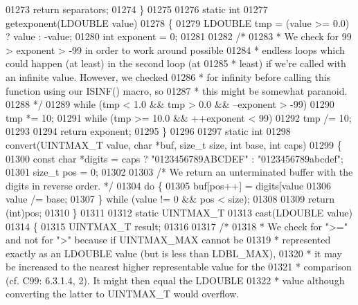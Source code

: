 \begin{DoxyCode}
{{{{{{{{{{01273     \textcolor{keywordflow}{return} separators;
01274 \}
01275 
01276 \textcolor{keyword}{static} \textcolor{keywordtype}{int}
01277 getexponent(LDOUBLE value)
01278 \{
01279     LDOUBLE tmp = (value >= 0.0) ? value : -value;
01280     \textcolor{keywordtype}{int} exponent = 0;
01281 
01282     \textcolor{comment}{/*}
01283 \textcolor{comment}{     * We check for 99 > exponent > -99 in order to work around possible}
01284 \textcolor{comment}{     * endless loops which could happen (at least) in the second loop (at}
01285 \textcolor{comment}{     * least) if we're called with an infinite value.  However, we checked}
01286 \textcolor{comment}{     * for infinity before calling this function using our ISINF() macro, so}
01287 \textcolor{comment}{     * this might be somewhat paranoid.}
01288 \textcolor{comment}{     */}
01289     \textcolor{keywordflow}{while} (tmp < 1.0 && tmp > 0.0 && --exponent > -99)
01290         tmp *= 10;
01291     \textcolor{keywordflow}{while} (tmp >= 10.0 && ++exponent < 99)
01292         tmp /= 10;
01293 
01294     \textcolor{keywordflow}{return} exponent;
01295 \}
01296 
01297 \textcolor{keyword}{static} \textcolor{keywordtype}{int}
01298 convert(UINTMAX\_T value, \textcolor{keywordtype}{char} *buf, \textcolor{keywordtype}{size\_t} size, \textcolor{keywordtype}{int} base, \textcolor{keywordtype}{int} caps)
01299 \{
01300     \textcolor{keyword}{const} \textcolor{keywordtype}{char} *digits = caps ? \textcolor{stringliteral}{"0123456789ABCDEF"} : \textcolor{stringliteral}{"0123456789abcdef"};
01301     \textcolor{keywordtype}{size\_t} pos = 0;
01302 
01303     \textcolor{comment}{/* We return an unterminated buffer with the digits in reverse order. */}
01304     \textcolor{keywordflow}{do} \{
01305         buf[pos++] = digits[value %
01306         value /= base;
01307     \} \textcolor{keywordflow}{while} (value != 0 && pos < size);
01308 
01309     \textcolor{keywordflow}{return} (\textcolor{keywordtype}{int})pos;
01310 \}
01311 
01312 \textcolor{keyword}{static} UINTMAX\_T
01313 cast(LDOUBLE value)
01314 \{
01315     UINTMAX\_T result;
01316 
01317     \textcolor{comment}{/*}
01318 \textcolor{comment}{     * We check for ">=" and not for ">" because if UINTMAX\_MAX cannot be}
01319 \textcolor{comment}{     * represented exactly as an LDOUBLE value (but is less than LDBL\_MAX),}
01320 \textcolor{comment}{     * it may be increased to the nearest higher representable value for the}
01321 \textcolor{comment}{     * comparison (cf. C99: 6.3.1.4, 2).  It might then equal the LDOUBLE}
01322 \textcolor{comment}{     * value although converting the latter to UINTMAX\_T would overflow.}
}}}}}}}}}}
\end{DoxyCode}
